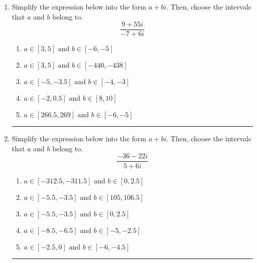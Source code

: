 \documentclass[14pt]{extbook}
\newcommand{\litem}[1]{\item#1\hspace*{-1cm}\rule{\textwidth}{0.4pt}}
\begin{document}
\begin{enumerate}
{\begin{enumerate}[label=\Alph*.]
\end{enumerate} }
\litem{
Simplify the expression below into the form $a+bi$. Then, choose the intervals that $a$ and $b$ belong to.\[ \frac{9 + 55 i}{-7 + 6 i} \]\begin{enumerate}[label=\Alph*.]
\item \( a \in [3, 5] \text{ and } b \in [-6, -5] \)
\item \( a \in [3, 5] \text{ and } b \in [-440, -438] \)
\item \( a \in [-5, -3.5] \text{ and } b \in [-4, -3] \)
\item \( a \in [-2, 0.5] \text{ and } b \in [8, 10] \)
\item \( a \in [266.5, 269] \text{ and } b \in [-6, -5] \)

\end{enumerate} }
\litem{
Simplify the expression below into the form $a+bi$. Then, choose the intervals that $a$ and $b$ belong to.\[ \frac{-36 - 22 i}{5 + 6 i} \]\begin{enumerate}[label=\Alph*.]
\item \( a \in [-312.5, -311.5] \text{ and } b \in [0, 2.5] \)
\item \( a \in [-5.5, -3.5] \text{ and } b \in [105, 106.5] \)
\item \( a \in [-5.5, -3.5] \text{ and } b \in [0, 2.5] \)
\item \( a \in [-8.5, -6.5] \text{ and } b \in [-5, -2.5] \)
\item \( a \in [-2.5, 0] \text{ and } b \in [-6, -4.5] \)

\end{enumerate} }
\end{enumerate}
\end{document}

